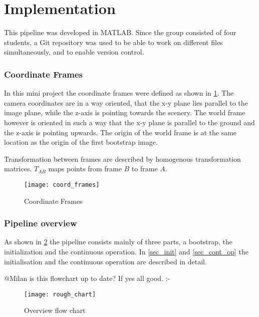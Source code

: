 \section{Implementation}

This pipeline was developed in MATLAB. Since the group consisted of four students, a Git repository was used to be able to work on different files simultaneously, and to enable version control.

\subsubsection{Coordinate Frames}
In this mini project the coordinate frames were defined as shown in \cref{img_coord_frames}. The camera coordinates are in a way oriented, that the x-y plane lies parallel to the image plane, while the z-axis is pointing towards the scenery. The world frame however is oriented in such a way that the x-y plane is parallel to the ground and the z-axis is pointing upwards. The origin of the world frame is at the same location as the origin of the first bootstrap image.

Transformation between frames are described by homogenous transformation matrices. $T_{AB}$ maps points from frame $B$ to frame $A$.

\begin{figure}[ht]
	\centering
	\texttt{[image: coord\_frames]}
	\caption{Coordinate Frames}
	\label{img_coord_frames}
\end{figure}

\subsubsection{Pipeline overview}

As shown in \cref{img_flow_rough} the pipeline consists mainly of three parts, a bootstrap, the initialization and the continuous operation. In \cref{sec_init} and \cref{sec_cont_op} the initialisation and the continuous operation are described in detail.

@Milan is this flowchart up to date? If yes all good. :-\)

\begin{figure}[ht]
	\centering
	\texttt{[image: rough\_chart]}
	\caption{Overview flow chart}
	\label{img_flow_rough}
\end{figure}

%

